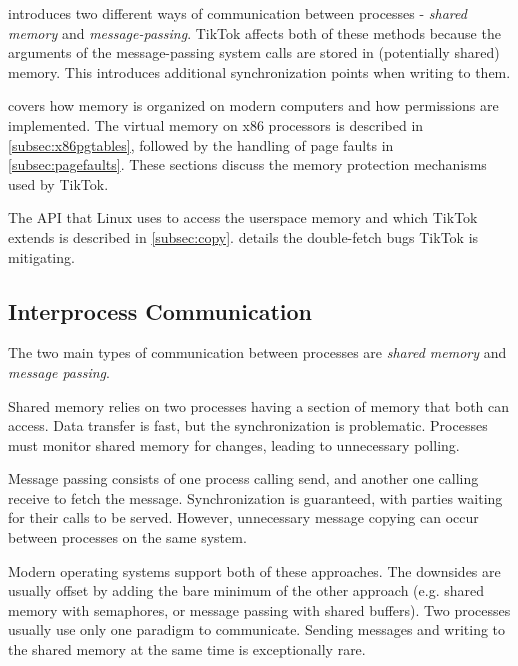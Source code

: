  introduces two different ways of communication between
processes - \emph{shared memory} and \emph{message-passing}. TikTok affects both
of these methods because the arguments of the message-passing system calls are
stored in (potentially shared) memory. This introduces additional
synchronization points when writing to them. 

 covers how memory is organized on modern computers and how
permissions are implemented. The virtual memory on x86 processors is described
in \cref{subsec:x86pgtables}, followed by the handling of page faults in
\cref{subsec:pagefaults}. These sections discuss the memory protection
mechanisms used by TikTok.

The API that Linux uses to access the userspace memory and which TikTok extends is
described in \cref{subsec:copy}.  details the
double-fetch bugs TikTok is mitigating.

\subsection{Interprocess Communication}
\label{subsec:ipc}

The two main types of communication between processes are \emph{shared memory} 
and \emph{message passing}\cite{silberschatz2018operating}.

Shared memory relies on two processes having a section of memory that both can 
access. Data transfer is fast, but the synchronization is problematic. 
Processes must monitor shared memory for changes, leading to unnecessary
polling.

Message passing consists of one process calling send, and another one calling
receive to fetch the message. Synchronization is guaranteed, with parties
waiting for their calls to be served. However, unnecessary message copying can
occur between processes on the same system.

Modern operating systems support both of these approaches. The downsides are
usually offset by adding the  bare minimum of the other approach (e.g. shared
memory with semaphores, or message passing with shared buffers). Two processes
usually use only one paradigm to communicate. Sending messages and writing
to the shared memory at the same time is exceptionally rare.

